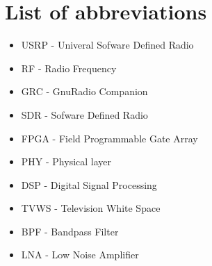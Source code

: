 \section*{List of abbreviations}



\begin{itemize}
\tightlist
\item
  USRP - Univeral Sofware Defined Radio
\item
  RF - Radio Frequency
\item
  GRC - GnuRadio Companion
\item
  SDR - Sofware Defined Radio
\item
  FPGA - Field Programmable Gate Array
\item
  PHY - Physical layer
\item
  DSP - Digital Signal Processing
\item
  TVWS - Television White Space
\item
  BPF - Bandpass Filter
\item
  LNA - Low Noise Amplifier
\end{itemize}
